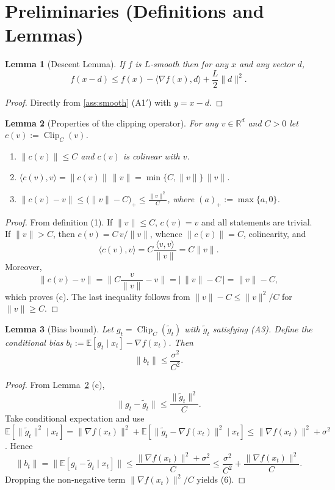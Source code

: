 \documentclass[11pt]{article}
\newtheorem{lemma}{Lemma}
\newcommand{\E}{\mathbb{E}}
\newcommand{\R}{\mathbb{R}}
\begin{document}
\section*{Preliminaries (Definitions and Lemmas)}

\begin{lemma}[Descent Lemma]\label{lem:descent}
If $f$ is $L$‑smooth then for any $x$ and any vector $d$,
\[
f(x-d)\le f(x)-\langle\nabla f(x),d\rangle+\frac{L}{2}\|d\|^{2}.
\tag{5}
\]
\end{lemma}
\begin{proof}
Directly from \ref{ass:smooth} (A1$'$) with $y=x-d$.
\end{proof}

\begin{lemma}[Properties of the clipping operator]\label{lem:clip}
For any $v\in\R^{d}$ and $C>0$ let $c(v):=\operatorname{Clip}_C(v)$.
\begin{enumerate}[label=(\alph*)]
\item $\|c(v)\|\le C$ and $c(v)$ is colinear with $v$.
\item $\langle c(v),v\rangle = \|c(v)\|\,\|v\| = \min\{C,\|v\|\}\,\|v\|$.
\item $\|c(v)-v\|\le\big(\|v\|-C\big)_{+}\le\frac{\|v\|^{2}}{C}$, where $(a)_{+}:=\max\{a,0\}$.
\end{enumerate}
\end{lemma}
\begin{proof}
From definition (1). If $\|v\|\le C$, $c(v)=v$ and all statements are trivial.  
If $\|v\|>C$, then $c(v)=C\,v/\|v\|$, whence $\|c(v)\|=C$, colinearity, and
\[
\langle c(v),v\rangle = C\frac{\langle v,v\rangle}{\|v\|}=C\|v\|.
\]
Moreover,
\[
\|c(v)-v\| = \Big\|C\frac{v}{\|v\|}-v\Big\|
= \Big|\,\|v\|-C\,\Big| = \|v\|-C,
\]
which proves (c). The last inequality follows from $\|v\|-C\le \|v\|^{2}/C$ for $\|v\|\ge C$.
\end{proof}

\begin{lemma}[Bias bound]\label{lem:bias}
Let $g_t=\operatorname{Clip}_C(\tilde g_t)$ with $\tilde g_t$ satisfying (A3).  
Define the conditional bias $b_t:=\E[g_t\mid x_t]-\nabla f(x_t)$. Then
\[
\|b_t\|\le \frac{\sigma^{2}}{C^{2}}.
\tag{6}
\]
\end{lemma}
\begin{proof}
From Lemma~\ref{lem:clip} (c),
\[
\|g_t-\tilde g_t\|\le\frac{\|\tilde g_t\|^{2}}{C}.
\]
Take conditional expectation and use $\E[\|\tilde g_t\|^{2}\mid x_t]
= \|\nabla f(x_t)\|^{2}+ \E[\|\tilde g_t-\nabla f(x_t)\|^{2}\mid x_t]
\le \|\nabla f(x_t)\|^{2}+\sigma^{2}$.
Hence
\[
\|b_t\|
= \big\|\E[g_t-\tilde g_t\mid x_t]\big\|
\le \frac{ \|\nabla f(x_t)\|^{2}+\sigma^{2}}{C}
\le \frac{\sigma^{2}}{C^{2}}+\frac{\|\nabla f(x_t)\|^{2}}{C}.
\]
Dropping the non‑negative term $\|\nabla f(x_t)\|^{2}/C$ yields (6).
\end{proof}
\end{document}
